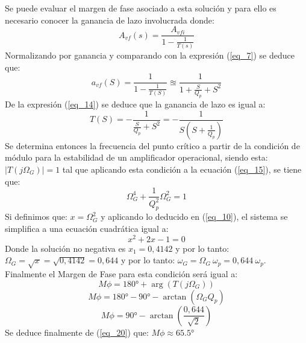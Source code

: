 \documentclass[12pt,a4paper]{article}
\begin{document}
\begin{itemize}
    Se puede evaluar el margen de fase asociado a esta solución y para ello es necesario conocer la ganancia de lazo involucrada donde:
    \begin{equation}
        \label{eq_13}
        A_{vf}(s) = \frac{A_{vfi}}{1 - \frac{1}{T(s)}}
    \end{equation}
    Normalizando por ganancia y comparando con la expresión (\ref{eq_7}) se deduce que:
    \begin{equation}
        \label{eq_14}
        a_{vf}(S) = \frac{1}{1 - \frac{1}{T(S)}} \approxeq \frac{1}{1 + \frac{S}{Q_{p}} + S^{2}}
    \end{equation}
    De la expresión (\ref{eq_14}) se deduce que la ganancia de lazo es igual a:
    \begin{equation}
        \label{eq_15}
        T(S) = -\frac{1}{\frac{S}{Q_{p}} + S^{2}} = -\frac{1}{S(S + \frac{1}{Q_{p}})}
    \end{equation}
    Se determina entonces la frecuencia del punto crítico a partir de la condición de módulo para la estabilidad de un amplificador operacional, siendo esta: $|T(j\Omega_G)| = 1$ tal que aplicando esta condición  a la ecuación (\ref{eq_15}), se tiene que:
    \begin{equation}
        \label{eq_16}
        \Omega_{G}^{4} + \frac{1}{Q_{p}^{2}} \Omega_{G}^{2} = 1
    \end{equation}
    Si definimos que: $x = \Omega_{G}^{2}$ y aplicando lo deducido en (\ref{eq_10}), el sistema se simplifica a una ecuación cuadrática igual a:
    \begin{equation}
        \label{eq_17}
        x^{2} + 2x - 1 = 0
    \end{equation}
    Donde la solución no negativa es $x_{1} = 0,4142$ y por lo tanto: $\Omega_{G} = \sqrt{x} = \sqrt{0,4142} = 0,644$ y por lo tanto: $\omega_{G} = \Omega_{G} \ \omega_{p} = 0,644 \ \omega_{p}$. Finalmente el Margen de Fase para esta condición será igual a:
    \begin{equation}
        \label{eq_18}
        M\phi = \ang{180} + \arg(T(j\Omega_{G}))
    \end{equation}
    \begin{equation}
        \label{eq_19}
        M\phi = \ang{180} - \ang{90} - \arctan(\Omega_{G} Q_{p})  
    \end{equation}
    \begin{equation}
        \label{eq_20}
        M\phi = \ang{90} - \arctan\left(\frac{0,644}{\sqrt{2}}\right) 
    \end{equation}
    Se deduce finalmente de (\ref{eq_20}) que: $M\phi \approx \ang{65,5}$


\end{itemize}
\end{document}
